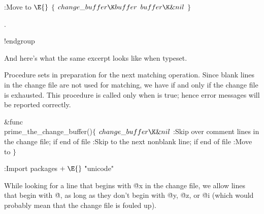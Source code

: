 \B{}:Move  to \X${}\E{}$\6
$\{{}$\1\6
${}\\{change\_buffer}\K\\{buffer}{}$\6
${}\\{buffer}\K\&{nil}{}$\2\6
${}\}{}$\par
{}.\fi

!endgroup
\endgroup
\vfil\eject

\def\runninghead{APPENDIX A --- FINAL DOCUMENT}

And here's what the same excerpt looks like when typeset.

Procedure 
sets  in preparation for the next matching operation.
Since blank lines in the change file are not used for matching, we have
 if and only if
the change file is exhausted. This procedure is called only when
 is true; hence error messages will be reported correctly.

\Y\B\&{func}\5
\\{prime\_the\_change\_buffer}()${}\{{}$\1\6
${}\\{change\_buffer}\K\&{nil}{}$\6
:Skip over comment lines in the change file;  if end of file%
\X\6
:Skip to the next nonblank line;  if end of file\X\6
:Move  to \X\2\6
${}\}{}$\Y\par
\fi

\B{}:Import packages\X${}\mathrel+\E{}$\6
\.{"unicode"}\par
\fi

While looking for a line that begins with \.{@x} in the change file, we
allow lines that begin with \.{@}, as long as they don't begin with \.{@y},
\.{@z}, or \.{@i} (which would probably mean that the change file is fouled up).

